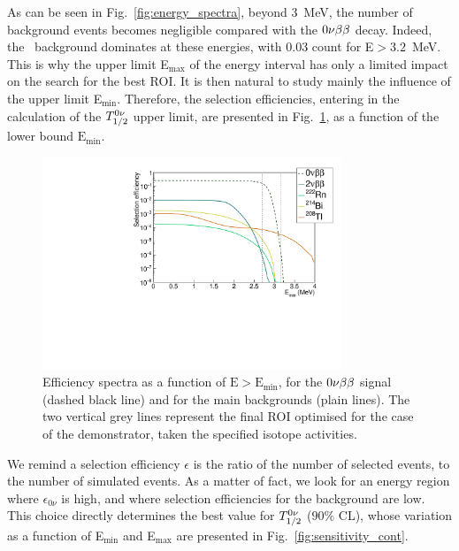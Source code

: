 As can be seen in Fig.~\ref{fig:energy_spectra}, beyond $3$~MeV, the number of background events becomes negligible compared with the $0\nu\beta\beta$ decay.
Indeed, the \Tl\ background dominates at these energies, with $0.03$ count for E$>3.2$~MeV.
This is why the upper limit E$_{\text{max}}$ of the energy interval has only a limited impact on the search for the best ROI.
It is then natural to study mainly the influence of the upper limit E$_{\text{min}}$.
Therefore, the selection efficiencies, entering in the calculation of the $T_{1/2}^{0\nu}$ upper limit, are presented in Fig.~\ref{fig:efficiency_spectra}, as a function of the lower bound $\text{E}_{\text{min}}$.
\begin{figure}[h]
  \centering
  \includegraphics[width=0.8\textwidth]{Sensitivity/fig_sensitivity/efficiency_spectrum_with_B_82Se.pdf}
  \caption{Efficiency spectra as a function of $\text{E}>\text{E}_{\text{min}}$, for the $0\nu\beta\beta$ signal (dashed black line) and for the main backgrounds (plain lines).
    The two vertical grey lines represent the final ROI optimised for the case of the demonstrator, taken the specified isotope activities.
    \label{fig:efficiency_spectra}}
\end{figure}
We remind a selection efficiency $\epsilon$ is the ratio of the number of selected events, to the number of simulated events.
As a matter of fact, we look for an energy region where $\epsilon_{0\nu}$ is high, and where selection efficiencies for the background are low.
This choice directly determines the best value for $T_{1/2}^{0\nu}$ ($90\%$ CL), whose variation as a function of E$_{\text{min}}$ and E$_{\text{max}}$ are presented in Fig.~\ref{fig:sensitivity_cont}.
